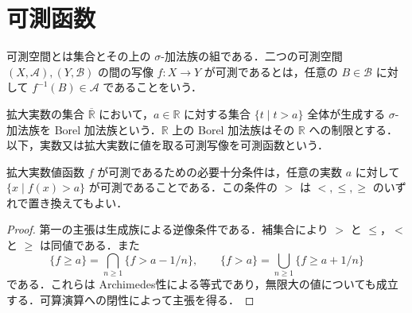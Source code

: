 \section{可測函数}
\begin{defn}[可測写像]
可測空間とは集合とその上の $\sigma$-加法族の組である．二つの可測空間 $(X,\mathcal A),(Y,\mathcal B)$ の間の写像 $f:X\to Y$ が可測であるとは，任意の $B\in\mathcal B$ に対して $f^{-1}(B)\in\mathcal A$ であることをいう．
\end{defn}
\begin{defn}[拡大実数上のBorel加法族]
拡大実数の集合 $\overline{\mathbb R}$ において，$a\in\mathbb R$ に対する集合 $\{t\mid t>a\}$ 全体が生成する $\sigma$-加法族を Borel 加法族という．$\mathbb R$ 上の Borel 加法族はその $\mathbb R$ への制限とする．以下，実数又は拡大実数に値を取る可測写像を可測函数という．
\end{defn}
\begin{prop}[可測函数の判定]
拡大実数値函数 $f$ が可測であるための必要十分条件は，任意の実数 $a$ に対して $\{x\mid f(x)>a\}$ が可測であることである．この条件の $>$ は $<,\leq,\geq$ のいずれで置き換えてもよい．
\end{prop}
\begin{proof}
第一の主張は生成族による逆像条件である．補集合により $>$ と $\leq$，$<$ と $\geq$ は同値である．また
\[
 \{f\geq a\}=\bigcap_{n\geq1}\{f>a-1/n\},\qquad
 \{f>a\}=\bigcup_{n\geq1}\{f\geq a+1/n\}
\]
である．これらは Archimedes性による等式であり，無限大の値についても成立する．可算演算への閉性によって主張を得る．
\end{proof}
